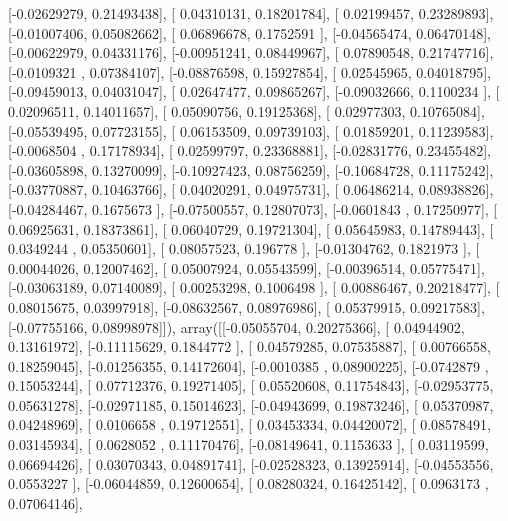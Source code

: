 \documentclass{article}
\begin{document}
       [-0.02629279,  0.21493438],
       [ 0.04310131,  0.18201784],
       [ 0.02199457,  0.23289893],
       [-0.01007406,  0.05082662],
       [ 0.06896678,  0.1752591 ],
       [-0.04565474,  0.06470148],
       [-0.00622979,  0.04331176],
       [-0.00951241,  0.08449967],
       [ 0.07890548,  0.21747716],
       [-0.0109321 ,  0.07384107],
       [-0.08876598,  0.15927854],
       [ 0.02545965,  0.04018795],
       [-0.09459013,  0.04031047],
       [ 0.02647477,  0.09865267],
       [-0.09032666,  0.1100234 ],
       [ 0.02096511,  0.14011657],
       [ 0.05090756,  0.19125368],
       [ 0.02977303,  0.10765084],
       [-0.05539495,  0.07723155],
       [ 0.06153509,  0.09739103],
       [ 0.01859201,  0.11239583],
       [-0.0068504 ,  0.17178934],
       [ 0.02599797,  0.23368881],
       [-0.02831776,  0.23455482],
       [-0.03605898,  0.13270099],
       [-0.10927423,  0.08756259],
       [-0.10684728,  0.11175242],
       [-0.03770887,  0.10463766],
       [ 0.04020291,  0.04975731],
       [ 0.06486214,  0.08938826],
       [-0.04284467,  0.1675673 ],
       [-0.07500557,  0.12807073],
       [-0.0601843 ,  0.17250977],
       [ 0.06925631,  0.18373861],
       [ 0.06040729,  0.19721304],
       [ 0.05645983,  0.14789443],
       [ 0.0349244 ,  0.05350601],
       [ 0.08057523,  0.196778  ],
       [-0.01304762,  0.1821973 ],
       [ 0.00044026,  0.12007462],
       [ 0.05007924,  0.05543599],
       [-0.00396514,  0.05775471],
       [-0.03063189,  0.07140089],
       [ 0.00253298,  0.1006498 ],
       [ 0.00886467,  0.20218477],
       [ 0.08015675,  0.03997918],
       [-0.08632567,  0.08976986],
       [ 0.05379915,  0.09217583],
       [-0.07755166,  0.08998978]]), array([[-0.05055704,  0.20275366],
       [ 0.04944902,  0.13161972],
       [-0.11115629,  0.1844772 ],
       [ 0.04579285,  0.07535887],
       [ 0.00766558,  0.18259045],
       [-0.01256355,  0.14172604],
       [-0.0010385 ,  0.08900225],
       [-0.0742879 ,  0.15053244],
       [ 0.07712376,  0.19271405],
       [ 0.05520608,  0.11754843],
       [-0.02953775,  0.05631278],
       [-0.02971185,  0.15014623],
       [-0.04943699,  0.19873246],
       [ 0.05370987,  0.04248969],
       [ 0.0106658 ,  0.19712551],
       [ 0.03453334,  0.04420072],
       [ 0.08578491,  0.03145934],
       [ 0.0628052 ,  0.11170476],
       [-0.08149641,  0.1153633 ],
       [ 0.03119599,  0.06694426],
       [ 0.03070343,  0.04891741],
       [-0.02528323,  0.13925914],
       [-0.04553556,  0.0553227 ],
       [-0.06044859,  0.12600654],
       [ 0.08280324,  0.16425142],
       [ 0.0963173 ,  0.07064146],
\end{document}

